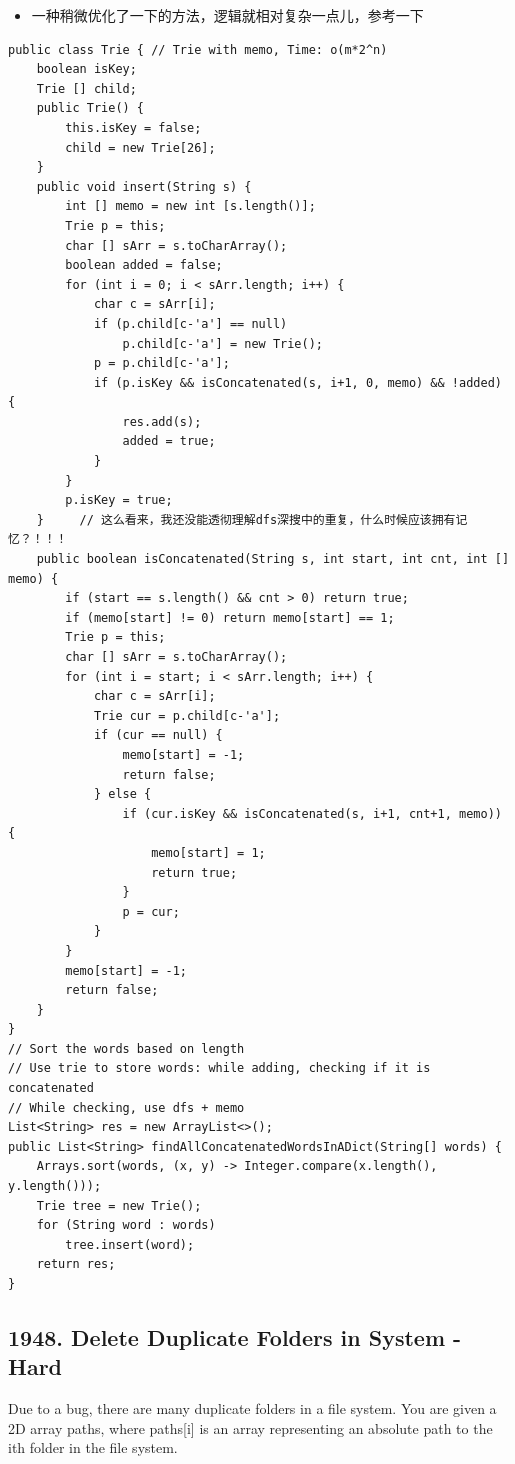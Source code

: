 \documentclass[9pt, b5paper]{article}
\begin{document}
\begin{itemize}
\item 一种稍微优化了一下的方法，逻辑就相对复杂一点儿，参考一下
\end{itemize}
\begin{verbatim}
public class Trie { // Trie with memo, Time: o(m*2^n)
    boolean isKey;
    Trie [] child;
    public Trie() {
        this.isKey = false;
        child = new Trie[26];
    }
    public void insert(String s) {
        int [] memo = new int [s.length()];
        Trie p = this;
        char [] sArr = s.toCharArray();
        boolean added = false;
        for (int i = 0; i < sArr.length; i++) {
            char c = sArr[i];
            if (p.child[c-'a'] == null)
                p.child[c-'a'] = new Trie();
            p = p.child[c-'a'];
            if (p.isKey && isConcatenated(s, i+1, 0, memo) && !added) {
                res.add(s);
                added = true;
            }
        }
        p.isKey = true;
    }     // 这么看来，我还没能透彻理解dfs深搜中的重复，什么时候应该拥有记忆？！！！
    public boolean isConcatenated(String s, int start, int cnt, int [] memo) {
        if (start == s.length() && cnt > 0) return true; 
        if (memo[start] != 0) return memo[start] == 1;
        Trie p = this;
        char [] sArr = s.toCharArray();
        for (int i = start; i < sArr.length; i++) {
            char c = sArr[i];
            Trie cur = p.child[c-'a'];
            if (cur == null) {
                memo[start] = -1;
                return false;
            } else {
                if (cur.isKey && isConcatenated(s, i+1, cnt+1, memo)) {
                    memo[start] = 1;
                    return true;
                }
                p = cur;
            }
        }
        memo[start] = -1;
        return false;
    }
}
// Sort the words based on length
// Use trie to store words: while adding, checking if it is concatenated
// While checking, use dfs + memo
List<String> res = new ArrayList<>();
public List<String> findAllConcatenatedWordsInADict(String[] words) {
    Arrays.sort(words, (x, y) -> Integer.compare(x.length(), y.length()));
    Trie tree = new Trie();
    for (String word : words) 
        tree.insert(word);
    return res;
}
\end{verbatim}

\subsection{1948. Delete Duplicate Folders in System - Hard}
\label{sec-13-7}
Due to a bug, there are many duplicate folders in a file system. You are given a 2D array paths, where paths[i] is an array representing an absolute path to the ith folder in the file system.
\end{document}
